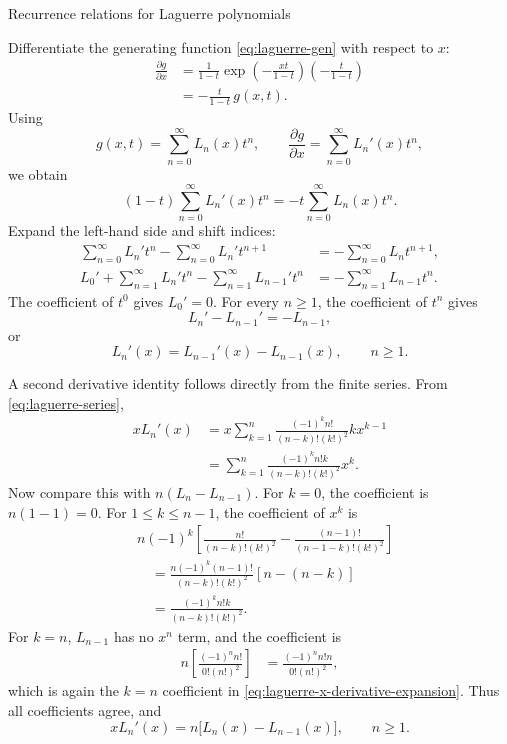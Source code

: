 \documentclass[11pt]{beamer}
\begin{document}
\begin{frame}[allowframebreaks]{Recurrence relations for Laguerre polynomials}
\footnotesize

Differentiate the generating function \eqref{eq:laguerre-gen} with respect to $x$:
\begin{align*}
  \frac{\partial g}{\partial x}
   &=
    \frac{1}{1-t}
    \exp\!\left(-\frac{xt}{1-t}\right)
    \left(-\frac{t}{1-t}\right)\\
   &=
    -\frac{t}{1-t}\,g(x,t).
\end{align*}
Using
\[
  g(x,t)=\sum_{n=0}^{\infty}L_n(x)t^n,
  \qquad
  \frac{\partial g}{\partial x}
    =\sum_{n=0}^{\infty}L_n'(x)t^n,
\]
we obtain
\[
  (1-t)\sum_{n=0}^{\infty}L_n'(x)t^n
    =-t\sum_{n=0}^{\infty}L_n(x)t^n.
\]
Expand the left-hand side and shift indices:
\begin{align*}
  \sum_{n=0}^{\infty}L_n't^n
   -\sum_{n=0}^{\infty}L_n't^{n+1}
   &=
   -\sum_{n=0}^{\infty}L_nt^{n+1},\\
  L_0'
   +\sum_{n=1}^{\infty}L_n't^n
   -\sum_{n=1}^{\infty}L_{n-1}'t^n
   &=
   -\sum_{n=1}^{\infty}L_{n-1}t^n.
\end{align*}
The coefficient of $t^0$ gives $L_0'=0$.  For every $n\ge1$, the coefficient
of $t^n$ gives
\[
  L_n'-L_{n-1}'=-L_{n-1},
\]
or
\begin{equation}
  L_n'(x)=L_{n-1}'(x)-L_{n-1}(x),
  \qquad n\ge1.
  \label{eq:laguerre-derivative-shift}
\end{equation}

A second derivative identity follows directly from the finite series.  From
\eqref{eq:laguerre-series},
\begin{equation}
\begin{aligned}
  xL_n'(x)
   &=
    x\sum_{k=1}^{n}
      \frac{(-1)^k n!}{(n-k)!(k!)^2}
      kx^{k-1}\\
   &=
    \sum_{k=1}^{n}
      \frac{(-1)^k n!k}{(n-k)!(k!)^2}x^k.
\end{aligned}
\label{eq:laguerre-x-derivative-expansion}
\end{equation}
Now compare this with $n(L_n-L_{n-1})$.  For $k=0$, the coefficient is
$n(1-1)=0$.  For $1\le k\le n-1$, the coefficient of $x^k$ is
\begin{align*}
  &n(-1)^k
  \left[
    \frac{n!}{(n-k)!(k!)^2}
    -\frac{(n-1)!}{(n-1-k)!(k!)^2}
  \right]\\
  &\quad=
  \frac{n(-1)^k(n-1)!}{(n-k)!(k!)^2}
  \left[n-(n-k)\right]\\
  &\quad=
  \frac{(-1)^k n!k}{(n-k)!(k!)^2}.
\end{align*}
For $k=n$, $L_{n-1}$ has no $x^n$ term, and the coefficient is
\begin{align*}
  n\left[
    \frac{(-1)^n n!}{0!(n!)^2}
  \right]
   &=
    \frac{(-1)^n n!n}{0!(n!)^2},
\end{align*}
which is again the $k=n$ coefficient in
\eqref{eq:laguerre-x-derivative-expansion}.  Thus all coefficients agree, and
\begin{equation}
  xL_n'(x)=n\bigl[L_n(x)-L_{n-1}(x)\bigr],
  \qquad n\ge1.
  \label{eq:laguerre-deriv}
\end{equation}


\end{frame}
\end{document}
